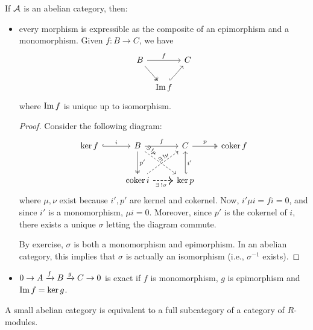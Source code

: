 \begin{fact} If $\mathcal{A}$ is an abelian category, then:
  \begin{itemize}
    \item every morphism is expressible as the composite of an epimorphism
      and a monomorphism. Given $f: B \to C$, we have
      \[
        \begin{tikzcd}[column sep=tiny]
          B \ar[rr, "f"] \ar[rd, twoheadrightarrow] & & C \\
               & \Image f \ar[ru, hook] &
        \end{tikzcd}
      \]
      where $\operatorname{Im} f$ is unique up to isomorphism.

      \begin{proof}
        Consider the following diagram:
        \[
          \begin{tikzcd}[row sep=25pt]
            \ker f \ar[r, "i", hookrightarrow] &
            B \ar[r, "f"] \ar[d, "p'", twoheadrightarrow]
            \ar[rd, "\exists ! \mu", dashed, very near start, sloped] &
            C \ar[r, "p", twoheadrightarrow] \ar[d, "i'", hookleftarrow]
            \ar[ld, "\exists ! \nu", dashed, leftarrow, pos=0.4, sloped] &
            \coker{f} \\
            & \coker{i} \ar[r, "\exists ! \sigma"', dashed, thick, pos=0.4] &
            \ker{p} &
          \end{tikzcd}
        \]
        where $\mu, \nu$ exist because $i', p'$ are kernel and cokernel.
        Now, $i' \mu i = f i = 0$, and since $i'$ is a monomorphism,
        $\mu i = 0$. Moreover, since $p'$ is the cokernel of $i$,
        there exists a unique $\sigma$ letting the diagram commute.

        By exercise, $\sigma$ is both a monomorphism and epimorphism.
        In an abelian category, this implies that $\sigma$ is
        actually an isomorphism (i.e., $\sigma^{-1}$ exists).
      \end{proof}
    \item $0 \to A \xrightarrow{f} B \xrightarrow{g} C \to 0$ is exact if
      $f$ is monomorphism, $g$ is epimorphism and $\operatorname{Im} f = \ker g$.
  \end{itemize}
\end{fact}

\begin{theorem}
  A small abelian category is equivalent to a full subcategory of a category
  of $R$-modules.
\end{theorem}

